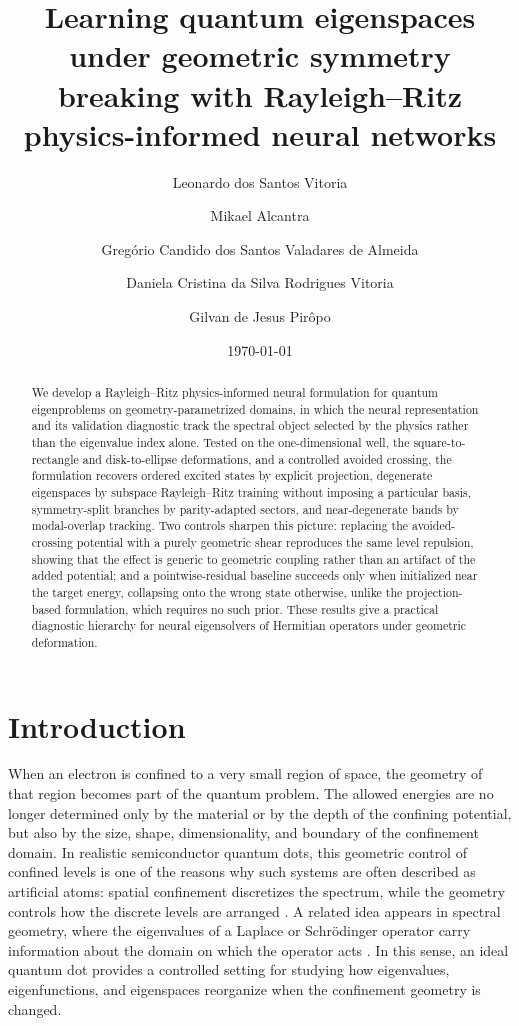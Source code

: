 \documentclass[10pt,onecolumn]{article}
\title{Learning quantum eigenspaces under geometric symmetry breaking with Rayleigh--Ritz physics-informed neural networks}
\author[1]{Leonardo dos Santos Vitoria}
\author[2]{Mikael Alcantra}
\author[2]{Gregório Candido dos Santos Valadares de Almeida}
\author[2]{Daniela Cristina da Silva Rodrigues Vitoria}
\author[2]{Gilvan de Jesus Pirôpo}
\affil[1]{Laboratório de Materiais Avançados e Minerais Estratégicos -- LMM,\\
Universidade Federal de Lavras (UFLA), Lavras, MG, Brazil}
\affil[2]{Universidade Federal de Sergipe (UFS), São Cristóvão, SE, Brazil}
\date{\today}
\begin{document}
\maketitle

\begin{abstract}

We develop a Rayleigh--Ritz physics-informed neural formulation for quantum eigenproblems on geometry-parametrized domains, in which the neural representation and its validation diagnostic track the spectral object selected by the physics rather than the eigenvalue index alone. Tested on the one-dimensional well, the square-to-rectangle and disk-to-ellipse deformations, and a controlled avoided crossing, the formulation recovers ordered excited states by explicit projection, degenerate eigenspaces by subspace Rayleigh--Ritz training without imposing a particular basis, symmetry-split branches by parity-adapted sectors, and near-degenerate bands by modal-overlap tracking. Two controls sharpen this picture: replacing the avoided-crossing potential with a purely geometric shear reproduces the same level repulsion, showing that the effect is generic to geometric coupling rather than an artifact of the added potential; and a pointwise-residual baseline succeeds only when initialized near the target energy, collapsing onto the wrong state otherwise, unlike the projection-based formulation, which requires no such prior. These results give a practical diagnostic hierarchy for neural eigensolvers of Hermitian operators under geometric deformation.

\end{abstract}

\section{Introduction}

When an electron is confined to a very small region of space, the geometry of that region becomes part of the quantum problem. The allowed energies are no longer determined only by the material or by the depth of the confining potential, but also by the size, shape, dimensionality, and boundary of the confinement domain. In realistic semiconductor quantum dots, this geometric control of confined levels is one of the reasons why such systems are often described as artificial atoms: spatial confinement discretizes the spectrum, while the geometry controls how the discrete levels are arranged \cite{Kastner1993,Ashoori1996,Kouwenhoven2001,Reimann2002,Jacak1998,Reimann1997}. A related idea appears in spectral geometry, where the eigenvalues of a Laplace or Schrödinger operator carry information about the domain on which the operator acts \cite{Kac1966,Weyl1911,Balian1970,Fox1967,Kuttler1984}. In this sense, an ideal quantum dot provides a controlled setting for studying how eigenvalues, eigenfunctions, and eigenspaces reorganize when the confinement geometry is changed.
\end{document}
